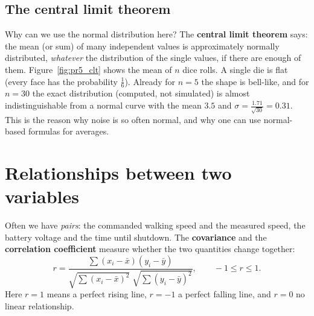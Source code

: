 \subsection*{The central limit theorem}
Why can we use the normal distribution here? The \textbf{central limit theorem} says: the mean (or sum) of many independent values is approximately normally distributed, \emph{whatever} the distribution of the single values, if there are enough of them. Figure~\ref{fig:pr5_clt} shows the mean of $n$ dice rolls. A single die is flat (every face has the probability $\frac16$). Already for $n=5$ the shape is bell-like, and for $n=30$ the exact distribution (computed, not simulated) is almost indistinguishable from a normal curve with the mean $3.5$ and $\sigma=\frac{1.71}{\sqrt{30}}=0.31$. This is the reason why noise is so often normal, and why one can use normal-based formulas for averages.

\begin{center}
\label{fig:pr5_clt}
\end{center}

\section*{Relationships between two variables}
Often we have \emph{pairs}: the commanded walking speed and the measured speed, the battery voltage and the time until shutdown. The \textbf{covariance} and the \textbf{correlation coefficient} measure whether the two quantities change together:
\[
r=\frac{\sum(x_i-\bar x)(y_i-\bar y)}{\sqrt{\sum(x_i-\bar x)^2}\;\sqrt{\sum(y_i-\bar y)^2}},\qquad-1\le r\le1.
\]
Here $r=1$ means a perfect rising line, $r=-1$ a perfect falling line, and $r=0$ no linear relationship.

